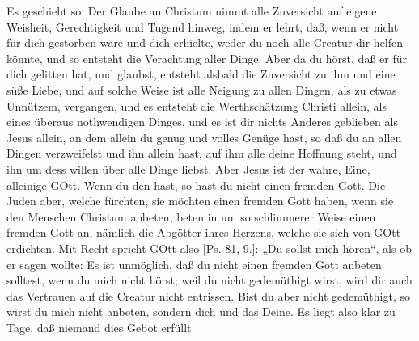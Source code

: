 Es geschieht so: Der Glaube an Christum nimmt alle Zuversicht auf eigene Weisheit, Gerechtigkeit und Tugend hinweg, indem er lehrt, daß, wenn er nicht für dich gestorben wäre und dich erhielte, weder du noch alle Creatur dir helfen könnte, und so entsteht die Verachtung aller Dinge. Aber da du hörst, daß er für dich gelitten hat, und glaubst, entsteht alsbald die Zuversicht zu ihm und eine süße Liebe, und auf solche Weise ist alle Neigung zu allen Dingen, als zu etwas Unnützem, vergangen, und es entsteht die Werthschätzung Christi allein, als eines überaus nothwendigen Dinges, und es ist dir nichts Anderes geblieben als Jesus allein, an dem allein du genug und volles Genüge hast, so daß du an allen Dingen verzweifelst und ihn allein hast, auf ihm alle deine Hoffnung steht, und ihn um dess willen über alle Dinge liebst. Aber Jesus ist der wahre, Eine, alleinige GOtt. Wenn du den hast, so hast du nicht einen fremden Gott. Die Juden aber, welche fürchten, sie möchten einen fremden Gott haben, wenn sie den Menschen Christum anbeten, beten in um so schlimmerer Weise einen fremden Gott an, nämlich die Abgötter ihres Herzens, welche sie sich von GOtt erdichten. Mit Recht spricht GOtt also [Ps. 81, 9.]: „Du sollst mich hören“, als ob er sagen wollte: Es ist unmöglich, daß du nicht einen fremden Gott anbeten solltest, wenn du mich nicht hörst; weil du nicht gedemüthigt wirst, wird dir auch das Vertrauen auf die Creatur nicht entrissen. Bist du aber nicht gedemüthigt, so wirst du mich nicht anbeten, sondern dich und das Deine. Es liegt also klar zu Tage, daß niemand dies Gebot erfüllt
